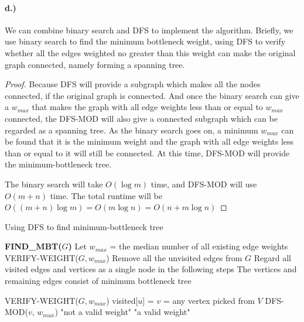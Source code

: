 \documentclass[a4paper,12pt]{article}
\begin{document}
\paragraph*{d.)} We can combine binary search and DFS to implement
the algorithm. Briefly, we use binary search to find the minimum 
bottleneck weight, using DFS to verify whether all the edges weighted 
no greater than this weight can make the original graph connected,
namely forming a spanning tree. 

\begin{proof}
Because DFS will provide a subgraph which makes all the nodes 
connected, if the original graph is connected. And once the binary
search can give a $w_{max}$ that makes the graph with all edge weights
less than or equal to $w_{max}$ connected, the DFS-MOD will also give
a connected subgraph which can be regarded as a spanning tree. As 
the binary search goes on, a minimum $w_{max}$ can be found that
it is the minimum weight and the graph with all edge weights less than
or equal to it will still be connected. At this time, DFS-MOD will provide
the minimum-bottleneck tree.

The binary search will take $O(\log m)$ time, and DFS-MOD will use
$O(m+n)$ time. The total runtime will be $O((m+n)\log m) = 
O(m\log n) = O(n + m\log n)$
\end{proof}

\begin{algorithm}
\caption{Using DFS to find minimum-bottleneck tree}
\begin{algorithmic}
\STATE \textbf{FIND\_MBT($G$)}
\STATE Let $w_{max}$ = the median number of all existing edge 
weights
\STATE VERIFY-WEIGHT($G, w_{max}$)
    \STATE Remove all the unvisited edges from $G$
\ELSE 
    \STATE Regard all visited edges and vertices as a single node in the
following steps
\ENDIF
\ENDWHILE
\STATE The vertices and remaining edges consist of minimum 
bottleneck tree
\end{algorithmic}
\end{algorithm}

\begin{algorithm}
\begin{algorithmic}
\STATE VERIFY-WEIGHT($G, w_{max}$)
    \STATE visited[$u$] = \FALSE
\ENDFOR
\STATE $v$ = any vertex picked from $V$
\STATE DFS-MOD($v$, $w_{max}$)
        \RETURN "not a valid weight"
        \ELSE \RETURN "a valid weight"
    \ENDIF
\ENDFOR
\end{algorithmic}
\end{algorithm}
\end{document}

